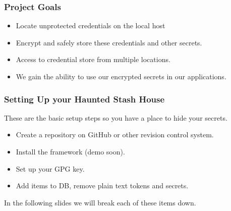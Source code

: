 \documentclass[aspectratio=169]{beamer}
\begin{document}
\begin{frame}
    \frametitle{Project Goals}
    \begin{itemize}
        \item Locate unprotected credentials on the local host
        \item Encrypt and safely store these credentials and other secrets.
        \item Access to credential store from multiple locations.
        \item We gain the ability to use our encrypted secrets in our applications.
    \end{itemize}


\end{frame}


\begin{frame}
    \frametitle{Setting Up your Haunted Stash House}
    These are the basic setup steps so you have a place to hide your secrets.
    \begin{itemize}
        \item Create a repository on GitHub or other revision control system.
        \item Install the framework (demo soon).
        \item Set up your GPG key.
        \item Add items to DB, remove plain text tokens and secrets.
    \end{itemize}
    In the following slides we will break each of these items down.
\end{frame}
\end{document}
